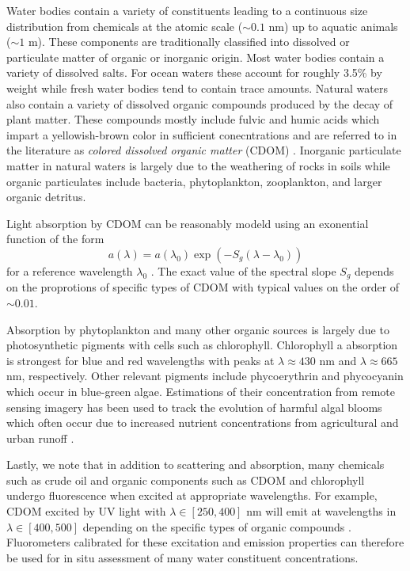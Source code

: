 Water bodies contain a variety of constituents leading to a continuous size
distribution from chemicals at the atomic scale ($\sim$$0.1$ nm) up to aquatic
animals ($\sim$$1$ m). These components are traditionally
classified into dissolved or particulate matter of organic or inorganic origin.
Most water bodies contain a variety of dissolved salts. For ocean waters these
account for roughly 3.5\% by weight while fresh water bodies tend to contain
trace amounts. Natural waters also contain a variety of dissolved organic
compounds produced by the decay of plant matter. These compounds mostly include
fulvic and humic acids which impart a yellowish-brown color in sufficient
conecntrations and are referred to in the literature as \textit{colored
  dissolved organic matter} (CDOM) \cite{cdom-acids}. Inorganic particulate
matter in natural waters is largely due to the weathering of rocks in soils
while organic particulates include bacteria, phytoplankton, zooplankton, and
larger organic detritus.

Light absorption by CDOM can be reasonably modeld using an exonential function
of the form
\begin{equation}
  a(\lambda) = a(\lambda_0)\exp(-S_g(\lambda - \lambda_0))
\end{equation}
for a reference wavelength $\lambda_0$ \cite{aurin2018remote}. The exact
value of the spectral slope $S_g$ depends on the proprotions of specific types
of CDOM with typical values on the order of $\sim$$0.01$.

Absorption by phytoplankton and many other organic sources is largely due to
photosynthetic pigments with cells such as chlorophyll. Chlorophyll a
absorption is strongest for blue and red wavelengths with peaks at
$\lambda\approx 430$ nm and $\lambda\approx 665$ nm, respectively. Other
relevant pigments include phycoerythrin and phycocyanin  which occur in
blue-green algae. Estimations of their concentration from remote sensing imagery
has been used to track the evolution of harmful algal blooms which often occur
due to increased nutrient concentrations from agricultural and urban runoff
\cite{algal-blooms-rs}.

Lastly, we note that in addition to scattering and absorption, many chemicals
such as crude oil and organic components such as CDOM and chlorophyll undergo
fluorescence when excited at appropriate wavelengths. For example, CDOM excited
by UV light with $\lambda\in[250, 400]$ nm will emit at wavelengths in
$\lambda\in[400, 500]$ depending on the specific types of organic compounds
\cite{cdom-fluorescence}. Fluorometers calibrated for these excitation
and emission properties can therefore be used for in situ assessment of many
water constituent concentrations.

